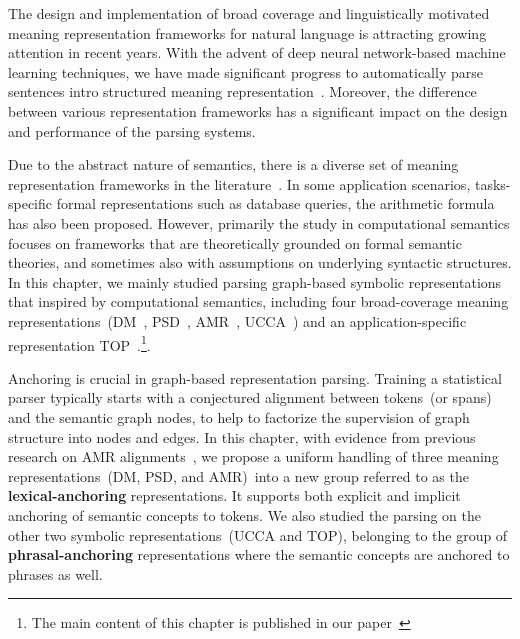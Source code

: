 The design and implementation of broad coverage and linguistically
motivated meaning representation frameworks for natural language is
attracting growing attention in recent years. With the advent of deep
neural network-based machine learning techniques, we have made
significant progress to automatically parse sentences intro structured
meaning
representation~\citep{Oep:Kuh:Miy:14,Oep:Kuh:Miy:15,May:2016wc,hershcovich-etal-2019-semeval}. Moreover,
the difference between various representation frameworks has a
significant impact on the design and performance of the parsing
systems.

Due to the abstract nature of semantics, there is a diverse set of
meaning representation frameworks in the
literature~\citep{abend2017state}. In some application scenarios,
tasks-specific formal representations such as database queries, the
arithmetic formula has also been proposed. However, primarily the
study in computational semantics focuses on frameworks that are
theoretically grounded on formal semantic theories, and sometimes also
with assumptions on underlying syntactic structures. In this chapter,
we mainly studied parsing graph-based symbolic representations that
inspired by computational semantics, including four broad-coverage
meaning representations~(DM~\citep{Iva:Oep:Ovr:12},
PSD~\citep{hajic2012announcing,miyao2014house},
AMR~\citet{Ban:Bon:Cai:13}, UCCA~\cite{Abe:Rap:13b}) and an
application-specific representation
TOP~\citep{gupta-etal-2018-semantic-parsing}.\footnote{The main
  content of this chapter is published in our
  paper~\citet{cao2019amazon}}.

Anchoring is crucial in graph-based representation parsing. Training a
statistical parser typically starts with a conjectured alignment
between tokens~(or spans) and the semantic graph nodes, to help to
factorize the supervision of graph structure into nodes and edges. In
this chapter, with evidence from previous research on AMR
alignments~\citep{Pourdamghani:2014aligning,Flanigan:2014vc,Wang:2017vt,chen2017unsupervised,szubert2018structured,lyu2018amr},
we propose a uniform handling of three meaning representations~(DM,
PSD, and AMR)~into a new group referred to as the
\textbf{lexical-anchoring} representations. It supports both explicit
and implicit anchoring of semantic concepts to tokens. We also studied
the parsing on the other two symbolic representations~(UCCA and TOP),
belonging to the group of \textbf{phrasal-anchoring} representations
where the semantic concepts are anchored to phrases as well.


